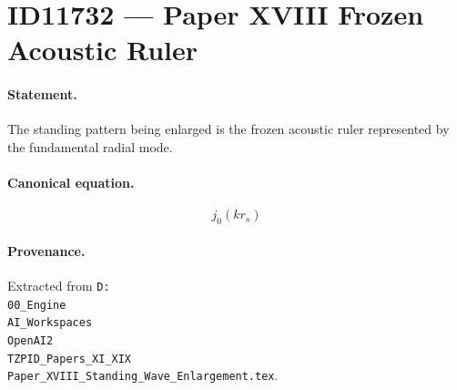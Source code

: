 \section*{ID11732 --- Paper XVIII Frozen Acoustic Ruler}

\paragraph{Statement.}
The standing pattern being enlarged is the frozen acoustic ruler represented by the fundamental radial mode.

\paragraph{Canonical equation.}
\[
j_0(k r_s)
\]

\paragraph{Provenance.}
Extracted from \texttt{D:\\00\_Engine\\AI\_Workspaces\\OpenAI2\\TZPID\_Papers\_XI\_XIX\\Paper\_XVIII\_Standing\_Wave\_Enlargement.tex}.

